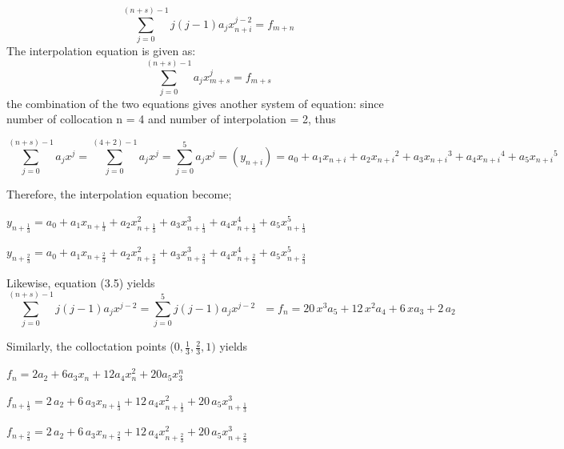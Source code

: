 \documentclass[12pt]{article}
\begin{document}
\begin{equation}
\sum_{j=0}^{(n+s)-1} j(j-1)a_{j}x_{n+i}^{j-2}= f_{m+n}
\end{equation}
The interpolation equation is given as:
\begin{equation}
\sum_{j=0}^{(n+s)-1} a_{j}x_{m+s}^{j}= f_{m+s}
\end{equation}
the combination of the two equations gives another system of equation:
since number of collocation n = 4 and number of interpolation = 2, thus

\begin{equation}
\sum_{j=0}^{(n+s)-1} a_{j}x^{j}= \sum_{j=0}^{(4+2)-1} a_{j}x^{j}=\sum_{j=0}^{5} a_{j}x^{j}=(y_{n+i})= a_{{0}}+a_{{1}} x_{{n+i}}+a_{{2}} {x_{{n+i}}}^{2}+a_{{3}} {
	x_{{n+i}}}^{3}+a_{{4}} {x_{{n+i}}}^{4}+a_{{5}} {x_{{n+i}}}^{5}
\end{equation}

Therefore, the interpolation equation become;

$y_{n+\frac{1}{3}}=a_{0}+a_{1}x_{n+\frac{1}{3}}+a_{2}x^{2}_{n+\frac{1}{3}}+a_{3}x^{3}_{n+\frac{1}{3}}+a_{4}x^{4}_{n+\frac{1}{3}}+a_{5}x^{5}_{n+\frac{1}{3}}$
\vspace{10pt}

$y_{n+\frac{2}{3}}=a_{0}+a_{1}x_{n+\frac{2}{3}}+a_{2}x^{2}_{n+\frac{2}{3}}+a_{3}x^{3}_{n+\frac{2}{3}}+a_{4}x^{4}_{n+\frac{2}{3}}+a_{5}x^{5}_{n+\frac{2}{3}}$
\vspace{10pt}


\vspace{10pt}

\noindent Likewise, equation (3.5) yields
$$\sum_{j=0}^{(n+s)-1} j(j-1)a_{j}x^{j-2}=\sum_{j=0}^{5} j(j-1)a_{j}x^{j-2} \ \ \ = f_n = 20\,{x}^{3}a_{{5}}+12\,{x}^{2}a_{{4}}+6\,xa_{{3}}+2\,a_{{2}}
$$

\noindent Similarly, the colloctation points ($0, \frac{1}{3},\frac{2}{3}, 1)$ yields

\vspace{10pt}
$f_n = 2a_2 + 6a_3x_n + 12 a_4x_n^2 + 20a_5x^n_3
$

\vspace{10pt}
$f_{n+\frac{1}{3}} = 2\,a_{2}+6\,a_{3} x_{{n+\frac{1}{3}}}+12\,a_{{4}}{x^{2}_{{n+\frac{1}{3}}}}+20\,
a_{{5}} {x^{3}_{{n+\frac{1}{3}}}}$


\vspace{10pt}
$f_{n+\frac{2}{3}} = 2\,a_{2}+6\,a_{3} x_{{n+\frac{2}{3}}}+12\,a_{{4}}{x^{2}_{{n+\frac{2}{3}}}}+20\,
a_{{5}} {x^{3}_{{n+\frac{2}{3}}}}$
\end{document}
